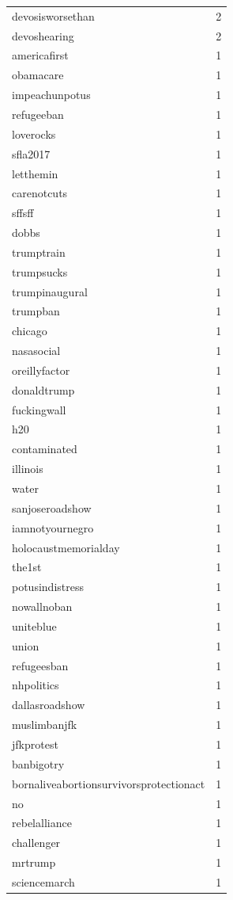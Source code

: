 \begin{tabular}{lr}
devosisworsethan & 2 \\
devoshearing & 2 \\
americafirst & 1 \\
obamacare & 1 \\
impeachunpotus & 1 \\
refugeeban & 1 \\
loverocks & 1 \\
sfla2017 & 1 \\
letthemin & 1 \\
carenotcuts & 1 \\
sffsff & 1 \\
dobbs & 1 \\
trumptrain & 1 \\
trumpsucks & 1 \\
trumpinaugural & 1 \\
trumpban & 1 \\
chicago & 1 \\
nasasocial & 1 \\
oreillyfactor & 1 \\
donaldtrump & 1 \\
fuckingwall & 1 \\
h20 & 1 \\
contaminated & 1 \\
illinois & 1 \\
water & 1 \\
sanjoseroadshow & 1 \\
iamnotyournegro & 1 \\
holocaustmemorialday & 1 \\
the1st & 1 \\
potusindistress & 1 \\
nowallnoban & 1 \\
uniteblue & 1 \\
union & 1 \\
refugeesban & 1 \\
nhpolitics & 1 \\
dallasroadshow & 1 \\
muslimbanjfk & 1 \\
jfkprotest & 1 \\
banbigotry & 1 \\
bornaliveabortionsurvivorsprotectionact & 1 \\
no & 1 \\
rebelalliance & 1 \\
challenger & 1 \\
mrtrump & 1 \\
sciencemarch & 1 \\

\end{tabular}
